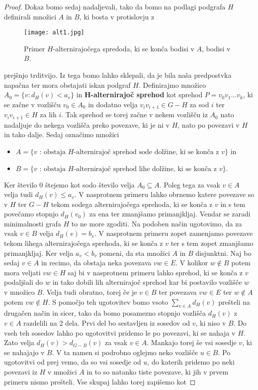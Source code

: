\documentclass[12pt,a4paper,twoside]{article}
\theoremstyle{definition} %
\theoremstyle{plain} %
\numberwithin{equation}{section}  %
\begin{document}
\begin{proof}
Dokaz bomo sedaj nadaljevali, tako da bomo na podlagi podgrafa $H$ definirali množici $A$ in $B$, ki bosta v protislovju z 
 \begin{figure}[h!]
\caption{Primer $H$-alternirajočega spredoda, ki se konča bodisi v $A$, bodisi v $B$.}
\label{im1}
\centering
    \texttt{[image: alt1.jpg]}
    \end{figure}
prejšnjo trditvijo. Iz tega bomo lahko sklepali, da je bila naša predpostvka napačna ter mora obstajati iskan podgraf $H$. 
Definirajmo množico $A_0 = \{v : d_H(v) < a_v\}$ in \textbf{H-alternirajoč sprehod} kot sprehod $P = v_0v_1\ldots v_k$, ki se začne v vozlišču $v_0 \in A_0$ in dodatno velja $v_iv_{i+1} \in G-H$ za sod $i$ ter $v_iv_{i+1} \in H$ za lih $i$. Tak sprehod se torej začne v nekem vozlišču iz $A_0$ nato nadaljuje do nekega vozlišča preko povezave, ki je ni v $H$, nato po povezavi v $H$ in tako dalje. Sedaj označimo množici
\begin{itemize}
\item $A = \{v \text{ : obstaja $H$-alternirajoč sprehod sode dolžine, ki se konča z $v$}\}$ in
\item $B =\{v \text{ : obstaja $H$-alternirajoč sprehod lihe dolžine, ki se konča z $v$}\}.$
\end{itemize}
Ker število $0$ štejemo kot sodo število velja $A_0 \subseteq A$. Poleg tega za vsak $v \in A$ velja tudi $d_H(v) \le a_v$. V nasprotnem primeru lahko obrnemo katere povezave so v $H$ ter $G-H$ tekom sodega alternirajočega sprehoda, ki se konča z $v$ in s tem povečamo stopnjo $d_H(v_0)$ za ena ter zmanjšamo primanjkljaj. Vendar se zaradi minimalnosti grafa $H$ to ne more zgoditi. Na podoben način ugotovimo, da za vsak $v \in B$ velja $d_H(v) = b_v$. V nasprotnem primeru zopet zamenjamo povezave tekom lihega alternirajočega sprehoda, ki se konča z $v$ ter s tem zopet zmanjšamo primanjkljaj. Ker velja $a_v < b_v$ pomeni, da sta množici $A$ in $B$ disjunktni. Naj bo sedaj $v \in A$ in recimo, da obstaja neka povezava $vw \in E$. V kolikor $w \notin B$ potem mora veljati $vw \in H$ saj bi v nasprotnem primeru lahko sprehod, ki se konča z $v$ podaljšali do $w$ in tako dobili lih alternirajoč sprehod kar bi postavilo vozlišče $w$ v množico $B$. Velja tudi obratno, torej če je $v \in B$ ter povezava $vw \in  E$ ter $w \notin A$ potem $vw \notin H$. S pomočjo teh ugotovitev bomo vsoto $\sum_{v \in A} d_H(v)$ prešteli na drugačen način in sicer, tako da bomo posamezno stopnjo vozlišča $d_H(v)$ z $v \in  A$ razdelili na 2 dela. Prvi del bo sestavljen iz sosedov od $v$, ki niso v $B$. Do vseh teh sosedov lahko po ugotovitvi pridemo le po povezavi, ki se nahaja v $H$. Zato velja $d_H(v) > d_{G-B}(v)$ za vsak $v \in A$. Mankajo torej še vsi sosedje $v$, ki se nahajajo v $B$. V ta namen si podrobno oglejmo neko vozlišče $u \in B$. Po ugotovitvi od prej vemo, da so vsi sosedje od $u$, do katerih pridemo po neki povezavi iz $H$ v množici $A$ in to so natanko tiste povezave, ki jih v prvem primeru nismo prešteli. Vse skupaj lahko torej zapišemo kot

\end{proof}
\end{document}
